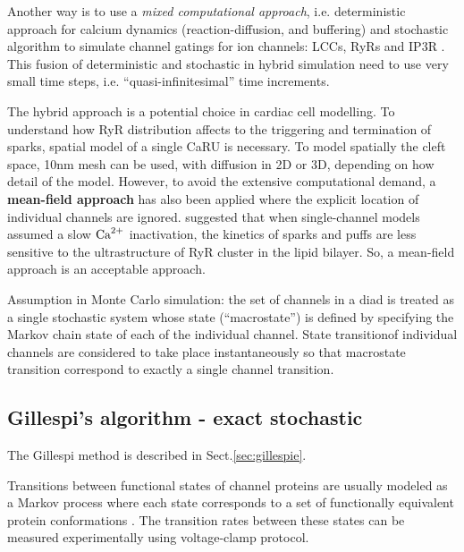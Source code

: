 Another way is to use a {\it mixed computational approach}, i.e.
deterministic approach for calcium dynamics (reaction-diffusion, and buffering)
and stochastic algorithm to simulate channel gatings for ion channels: LCCs,
RyRs \citep{stern1997, stern1999lcm, greenstein2002, hinch2004mag} and IP3R
\citep{rudiger2007, shuai2007kmip3r, shuai2008}. This fusion of deterministic
and stochastic in hybrid simulation need to use very
small time steps, i.e. ``quasi-infinitesimal'' time increments.

The hybrid approach is a potential choice in cardiac cell modelling. To
understand how RyR distribution affects to the triggering and termination of
sparks, spatial model of a single CaRU is necessary. To model spatially the
cleft space, 10nm mesh can be used, with diffusion in 2D or 3D, depending on how
detail of the model. However, to avoid the extensive computational demand, a
{\bf mean-field approach} has also been applied where the explicit location of
individual channels are ignored. \citep{deremigio2008crs} suggested that when
single-channel models assumed a slow ${\text{Ca}^{2+}}$ inactivation, the kinetics of sparks
and puffs are less sensitive to the ultrastructure of RyR cluster in the lipid
bilayer. So, a mean-field approach is an acceptable approach.

\begin{framed}
  Assumption in Monte Carlo simulation: the set of channels in a diad
  is treated as a single stochastic system whose state
  (``macrostate'') is defined by specifying the Markov chain state of
  each of the individual channel. State transitionof individual
  channels are considered to take place instantaneously so that
  macrostate transition correspond to exactly a single channel
  transition. 
\end{framed}

\subsection{Gillespi's algorithm - exact stochastic}

The Gillespi method is described in Sect.\ref{sec:gillespie}. 

\begin{framed}
Transitions between functional states of channel proteins are usually modeled as
a Markov process where each state corresponds to a set of functionally
equivalent protein conformations \citep{smith2002}. The transition rates between
these states can be measured experimentally using voltage-clamp protocol. 
\end{framed}

